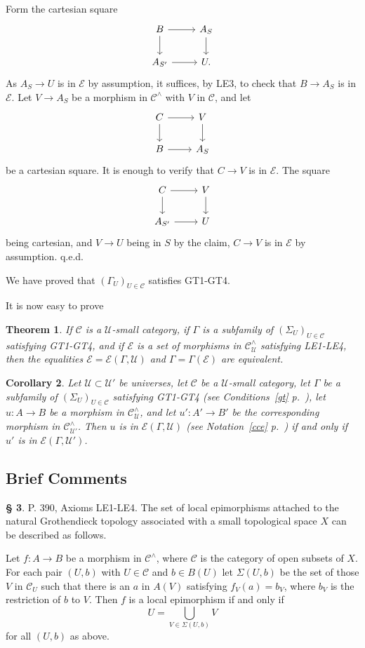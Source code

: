 \documentclass[12pt]{article}%
\newtheorem{thm}{Theorem}%
\newtheorem{cor}[thm]{Corollary}
\theoremstyle{remark}
\theoremstyle{definition}
\newtheorem{s}[thm]{\S}%
\newcommand{\cc}{\mathcal}
\newcommand{\C}{\mathcal C}
\newcommand{\U}{\mathcal U}
\begin{document}
Form the cartesian square 
$$
\begin{tikzcd}
B\ar{r}\ar{d}&A_S\ar{d}\\ 
A_{S'}\ar{r}&U.
\end{tikzcd}
$$ 
As $A_S\to U$ is in $\cc E$ by assumption, it suffices, by LE3, to check that $B\to A_S$ is in $\cc E$. Let $V\to A_S$ be a morphism in $\C^\wedge$ with $V$ in $\C$, and let 
$$
\begin{tikzcd}
C\ar{r}\ar{d}&V\ar{d}\\ 
B\ar{r}&A_S
\end{tikzcd}
$$ 
be a cartesian square. It is enough to verify that $C\to V$ is in $\cc E$. The square 
$$
\begin{tikzcd}
C\ar{r}\ar{d}&V\ar{d}\\ 
A_{S'}\ar{r}&U
\end{tikzcd}
$$ 
being cartesian, and $V\to U$ being in $S$ by the claim, $C\to V$ is in $\cc E$ by assumption. q.e.d.

We have proved that $(\Gamma_U)_{U\in\C}$ satisfies GT1-GT4. 

It is now easy to prove 

\begin{thm}
If $\C$ is a $\U$-small category, if $\Gamma$ is a subfamily of $(\Sigma_U)_{U\in\C}$ satisfying GT1-GT4, and if $\cc E$ is a set of morphisms in $\C^\wedge_\U$ satisfying LE1-LE4, then the equalities $\cc E=\cc E(\Gamma,\U)$ and $\Gamma=\Gamma(\cc E)$ are equivalent.
\end{thm}

\begin{cor}\label{leu}
Let $\U\subset\U'$ be universes, let $\C$ be a $\U$-small category, let $\Gamma$ be a subfamily of $(\Sigma_U)_{U\in\C}$ satisfying GT1-GT4 (see Conditions~\ref{gt} p.~\pageref{gt}), let $u:A\to B$ be a morphism in $\C^\wedge_\U$, and let $u':A'\to B'$ be the corresponding morphism in $\C^\wedge_{\U'}$. Then $u$ is in $\cc E(\Gamma,\U)$ (see Notation~\ref{cce} p.~\pageref{cce}) if and only if $u'$ is in $\cc E(\Gamma,\U')$.
\end{cor}


\subsection{Brief Comments}

\begin{s} 
P. 390, Axioms LE1-LE4. The set of local epimorphisms attached to the natural Grothendieck topology associated with a small topological space $X$ can be described as follows. 

Let $f:A\to B$ be a morphism in $\C^\wedge$, where $\C$ is the category of open subsets of $X$. For each pair $(U,b)$ with $U\in\C$ and $b\in B(U)$ let $\Sigma(U,b)$ be the set of those $V$ in $\C_U$ such that there is an $a$ in $A(V)$ satisfying $f_V(a)=b_V$, where $b_V$ is the restriction of $b$ to $V$. Then $f$ is a local epimorphism if and only if 
$$
U=\bigcup_{V\in\Sigma(U,b)}V
$$ 
for all $(U,b)$ as above.
\end{s}
\end{document}
